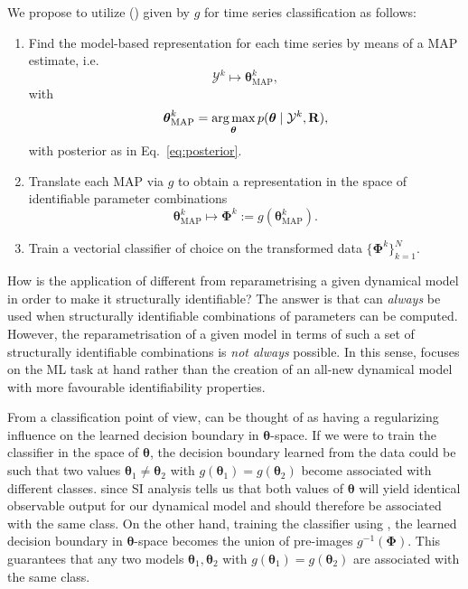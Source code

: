 We propose to utilize \myMethodFull{} (\myMethod{}) given by $g$ for time series classification as follows:
\begin{enumerate}
    \item Find the model-based representation for each time series by means of a MAP estimate, i.e.
    \begin{equation}
        \mathcal{Y}^{k} \mapsto \boldsymbol{\theta}_{\text{MAP}}^{k},
    \end{equation}
    with 
    \begin{equation}
        \boldsymbol{\theta}_{\text{MAP}}^{k} =  \operatorname*{arg\,max}_{\boldsymbol{\theta}} p(\boldsymbol{\theta} \mid \mathcal{Y}^{k}, \mathbf{R}),
    \end{equation}
    with posterior as in Eq.~\eqref{eq:posterior}.
    \item Translate each MAP via $g$ to obtain a representation in the space of identifiable parameter combinations
    \begin{equation}\label{eq:SIM}
        \boldsymbol{\theta}_{\text{MAP}}^{k} \mapsto \boldsymbol{\Phi}^{k} := g(\boldsymbol{\theta}_{\text{MAP}}^{k}).
    \end{equation}
    \item Train a vectorial classifier of choice on the transformed data $\{ \boldsymbol{\Phi}^{k} \}_{k = 1}^{N}$.
\end{enumerate}

How is the application of \myMethod{} different from reparametrising a given dynamical model in order to make it structurally identifiable?
The answer is that \myMethod{} can \emph{always} be used when structurally identifiable combinations of parameters can be computed.
However, the reparametrisation of a given model in terms of such a set of structurally identifiable combinations is \emph{not always} possible.
In this sense, \myMethod{} focuses on the ML task at hand rather than the creation of an all-new dynamical model with more favourable identifiability properties.

From a classification point of view, \myMethod{} can be thought of as having a regularizing influence on the learned decision boundary in  $\boldsymbol{\theta}$-space. 
If we were to train the classifier in the space of $\boldsymbol{\theta}$, the decision boundary learned from the data could be such that two values $\boldsymbol{\theta}_{1} \neq \boldsymbol{\theta}_{2}$ with $g(\boldsymbol{\theta}_{1}) = g(\boldsymbol{\theta}_{2})$ become associated with different classes.
since SI analysis tells us that both values of $\boldsymbol{\theta}$ will yield identical observable output for our dynamical model and should therefore be associated with the same class.
On the other hand, training the classifier using \myMethod{}, the learned decision boundary in $\boldsymbol{\theta}$-space becomes the union of pre-images $g^{-1}(\boldsymbol{\Phi})$. 
This guarantees that any two models $\boldsymbol{\theta}_{1}, \boldsymbol{\theta}_{2}$ with $g(\boldsymbol{\theta}_{1}) = g(\boldsymbol{\theta}_{2})$ are  associated with the same class.